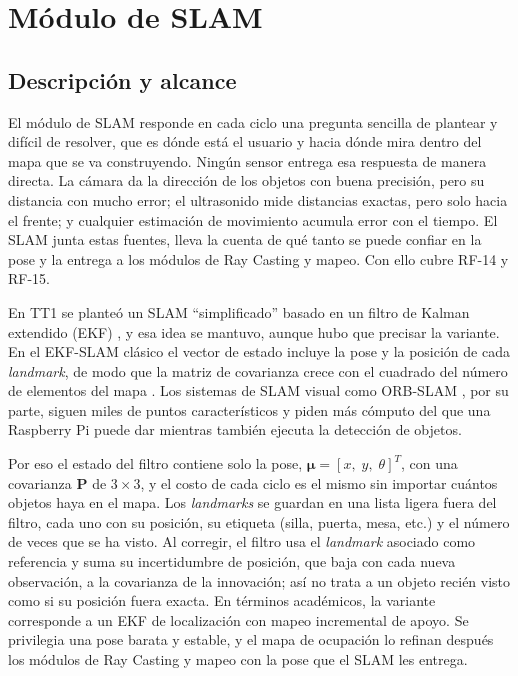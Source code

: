 \section{Módulo de SLAM}
\label{sec:dev_slam}

\subsection{Descripción y alcance}

El módulo de SLAM responde en cada ciclo una pregunta sencilla de plantear y difícil de
resolver, que es dónde está el usuario y hacia dónde mira dentro del mapa que se va
construyendo. Ningún sensor entrega esa respuesta de manera directa. La cámara da la
dirección de los objetos con buena precisión, pero su distancia con mucho error; el
ultrasonido mide distancias exactas, pero solo hacia el frente; y cualquier estimación
de movimiento acumula error con el tiempo. El SLAM junta estas fuentes, lleva la cuenta
de qué tanto se puede confiar en la pose y la entrega a los módulos de Ray Casting y
mapeo. Con ello cubre RF-14 y RF-15.

En TT1 se planteó un SLAM ``simplificado'' basado en un filtro de Kalman extendido
(EKF) \cite{kalman1960, thrun2005probabilistic}, y esa idea se mantuvo, aunque hubo que
precisar la variante. En el EKF-SLAM clásico \cite{smith1990uncertain} el vector de
estado incluye la pose y la posición de cada \emph{landmark}, de modo que la matriz de
covarianza crece con el cuadrado del número de elementos del mapa
\cite{bailey2006slam2}. Los sistemas de SLAM visual como ORB-SLAM
\cite{murartal2015orbslam}, por su parte, siguen miles de puntos característicos y
piden más cómputo del que una Raspberry Pi puede dar mientras también ejecuta la
detección de objetos.

Por eso el estado del filtro contiene solo la pose, $\boldsymbol{\mu} = [x,\; y,\;
\theta]^T$, con una covarianza $\mathbf{P}$ de $3 \times 3$, y el costo de cada ciclo es
el mismo sin importar cuántos objetos haya en el mapa. Los \emph{landmarks} se guardan
en una lista ligera fuera del filtro, cada uno con su posición, su etiqueta (silla,
puerta, mesa, etc.) y el número de veces que se ha visto. Al corregir, el filtro usa el
\emph{landmark} asociado como referencia y suma su incertidumbre de posición, que baja
con cada nueva observación, a la covarianza de la innovación; así no trata a un objeto
recién visto como si su posición fuera exacta. En términos académicos, la variante
corresponde a un EKF de localización con mapeo incremental de apoyo. Se privilegia una
pose barata y estable, y el mapa de ocupación lo refinan después los módulos de Ray
Casting y mapeo con la pose que el SLAM les entrega.

